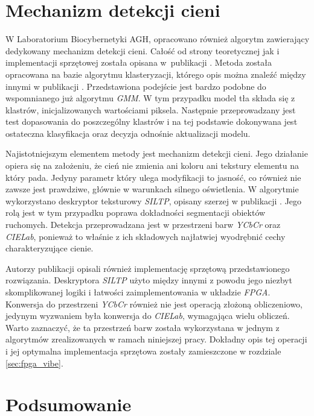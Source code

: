 \section{Mechanizm detekcji cieni}
\label{sec:cienie}

W Laboratorium Biocybernetyki AGH, opracowano również algorytm zawierający dedykowany mechanizm detekcji cieni. Całość od strony teoretycznej jak i implementacji sprzętowej została opisana w~publikacji \cite{kryjak_11_shadows}. Metoda została opracowana na bazie algorytmu klasteryzacji, którego opis można znaleźć między innymi w publikacji \cite{butler_03}. Przedstawiona podejście jest bardzo podobne do wspomnianego już algorytmu \textit{GMM}. W tym przypadku model tła składa się z klastrów, inicjalizowanych wartościami piksela. Następnie przeprowadzany jest test dopasowania do poszczególny klastrów i na tej podstawie dokonywana jest ostateczna klasyfikacja oraz decyzja odnośnie aktualizacji modelu.

Najistotniejszym elementem metody jest mechanizm detekcji cieni. Jego działanie opiera się na założeniu, że cień nie zmienia ani koloru ani tekstury elementu na który pada. Jedyny parametr który ulega modyfikacji to jasność, co również nie zawsze jest prawdziwe, głównie w warunkach silnego oświetlenia. W algorytmie wykorzystano deskryptor teksturowy \textit{SILTP}, opisany szerzej w publikacji \cite{qin_10}. Jego rolą jest w tym przypadku poprawa dokładności segmentacji obiektów ruchomych. Detekcja przeprowadzana jest w przestrzeni barw \textit{YCbCr} oraz \textit{CIELab}, ponieważ to właśnie z ich składowych najłatwiej wyodrębnić cechy charakteryzujące cienie.

Autorzy publikacji \cite{kryjak_11_shadows} opisali również implementację sprzętową przedstawionego rozwiązania. Deskryptora \textit{SILTP} użyto między innymi z powodu jego niezbyt skomplikowanej logiki i łatwości zaimplementowania w układzie \textit{FPGA}. Konwersja do przestrzeni \textit{YCbCr} również nie jest operacją złożoną obliczeniowo, jedynym wyzwaniem była konwersja do \textit{CIELab}, wymagająca wielu obliczeń. Warto zaznaczyć, że ta przestrzeń barw została wykorzystana w jednym z algorytmów zrealizowanych w ramach niniejszej pracy. Dokładny opis tej operacji i jej optymalna implementacja sprzętowa zostały zamieszczone w rozdziale \ref{sec:fpga_vibe}. 

\section{Podsumowanie}
\label{sec:przeglad_podsumowanie}

